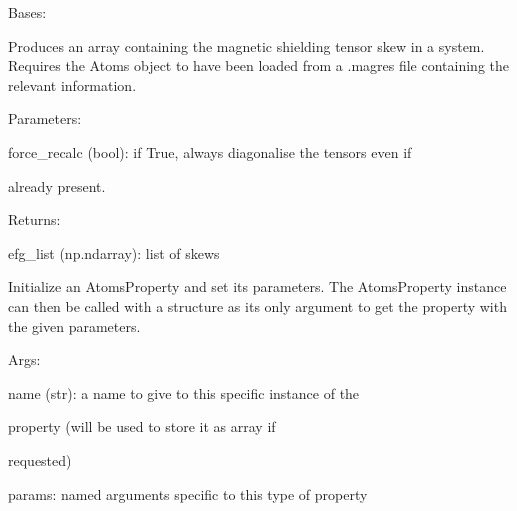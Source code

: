 \documentclass[letterpaper,10pt,english]{sphinxmanual}
\begin{document}
\begin{fulllineitems}
\label{doctree/soprano.properties.nmr.efg:soprano.properties.nmr.efg.EFGSkew}
Bases: {\hyperref[doctree/soprano.properties.atomsproperty:soprano.properties.atomsproperty.AtomsProperty]{\emph{}}}

Produces an array containing the magnetic shielding tensor skew
in a system.
Requires the Atoms object to have been loaded from a .magres file
containing the relevant information.

\begin{DUlineblock}{0em}
\item[] Parameters:
\item[]
\begin{DUlineblock}{\DUlineblockindent}
\item[] force\_recalc (bool): if True, always diagonalise the tensors even if
\item[]
\begin{DUlineblock}{\DUlineblockindent}
\item[] already present.
\end{DUlineblock}
\end{DUlineblock}
\end{DUlineblock}

\begin{DUlineblock}{0em}
\item[] Returns:
\item[]
\begin{DUlineblock}{\DUlineblockindent}
\item[] efg\_list (np.ndarray): list of skews
\end{DUlineblock}
\end{DUlineblock}

Initialize an AtomsProperty and set its parameters.
The AtomsProperty instance can then be called with a structure as its
only argument to get the property with the given parameters.

\begin{DUlineblock}{0em}
\item[] Args:
\item[]
\begin{DUlineblock}{\DUlineblockindent}
\item[] name (str): a name to give to this specific instance of the
\item[]
\begin{DUlineblock}{\DUlineblockindent}
\item[] property (will be used to store it as array if
\item[] requested)
\end{DUlineblock}
\item[] params: named arguments specific to this type of property
\end{DUlineblock}
\end{DUlineblock}


\end{fulllineitems}
\end{document}

